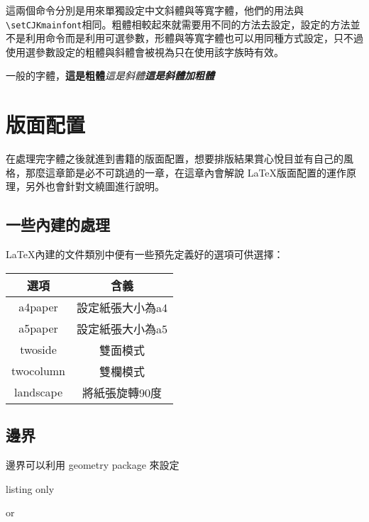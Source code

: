 這兩個命令分別是用來單獨設定中文斜體與等寬字體，他們的用法與\verb|\setCJKmainfont|相同。粗體相較起來就需要用不同的方法去設定，設定的方法並不是利用命令而是利用可選參數，形體與等寬字體也可以用同種方式設定，只不過使用選參數設定的粗體與斜體會被視為只在使用該字族時有效。

\begin{tcblisting}{}
一般的字體，\textbf{這是粗體}\textit{這是斜體}\textbf{\textit{這是斜體加粗體}}
\end{tcblisting}

\chapter{版面配置}

在處理完字體之後就進到書籍的版面配置，想要排版結果賞心悅目並有自己的風格，那麼這章節是必不可跳過的一章，在這章內會解說 \LaTeX 版面配置的運作原理，另外也會針對文繞圖進行說明。

\section{一些內建的處理}

\LaTeX 內建的文件類別中便有一些預先定義好的選項可供選擇：

\begin{tabular}{cc}
\hline
選項 & 含義 \\\hline\hline
a4paper & 設定紙張大小為a4 \\\hline
a5paper & 設定紙張大小為a5 \\\hline
twoside & 雙面模式 \\\hline
twocolumn & 雙欄模式 \\\hline
landscape & 將紙張旋轉90度 \\\hline
\end{tabular}

\section{邊界}

邊界可以利用 geometry package 來設定

\begin{tcblisting}{listing only}
\usepackage[key1=value, key2=value]{geometry}
or
\usepackage{geometry}
\geometry{key1=value, key2=value}
\end{tcblisting}


